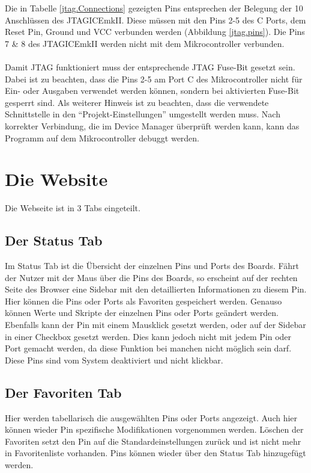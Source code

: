Die in Tabelle \ref{jtag.Connections} gezeigten Pins entsprechen der Belegung
der 10 Anschlüssen des JTAGICEmkII. Diese müssen mit den Pins 2-5 des C Ports, dem
Reset Pin, Ground und VCC verbunden werden (Abbildung \ref{jtag.pins}). Die Pins 7 \& 8
des JTAGICEmkII werden nicht mit dem Mikrocontroller verbunden.\\
\\
Damit \ac{JTAG} funktioniert muss der entsprechende \ac{JTAG} Fuse-Bit gesetzt sein.
Dabei ist zu beachten, dass die Pins 2-5 am Port C des Mikrocontroller nicht für
Ein- oder Ausgaben verwendet werden können, sondern bei aktivierten Fuse-Bit
gesperrt sind. Als weiterer Hinweis ist zu beachten, dass die verwendete
Schnittstelle in den "`Projekt-Einstellungen"' umgestellt werden muss. Nach
korrekter Verbindung, die im Device Manager überprüft werden kann, kann das
Programm auf dem Mikrocontroller debuggt werden.

\section{Die Website}

Die Webseite ist in 3 Tabs eingeteilt. 

\subsection{Der Status Tab}
Im Status Tab ist die Übersicht der
einzelnen Pins und Ports des Boards. Fährt der Nutzer mit der Maus über die Pins des
Boards, so erscheint auf der rechten Seite des Browser eine Sidebar mit den
detaillierten Informationen zu diesem Pin. Hier können die Pins oder Ports
als Favoriten gespeichert werden. Genauso können Werte und Skripte der einzelnen
Pins oder Ports geändert werden.\\
Ebenfalls kann der Pin mit einem Mausklick gesetzt werden, oder auf der Sidebar in einer 
Checkbox gesetzt werden. Dies kann jedoch nicht mit jedem Pin oder Port gemacht werden, da 
diese Funktion bei manchen nicht möglich sein darf. Diese Pins sind vom System deaktiviert und 
nicht klickbar.
\subsection{Der Favoriten Tab}
Hier werden tabellarisch die ausgewählten Pins oder Ports angezeigt. Auch hier
können wieder Pin spezifische Modifikationen vorgenommen werden. Löschen der
Favoriten setzt den Pin auf die Standardeinstellungen zurück und ist nicht mehr
in Favoritenliste vorhanden. Pins können wieder über den Status Tab hinzugefügt
werden.

